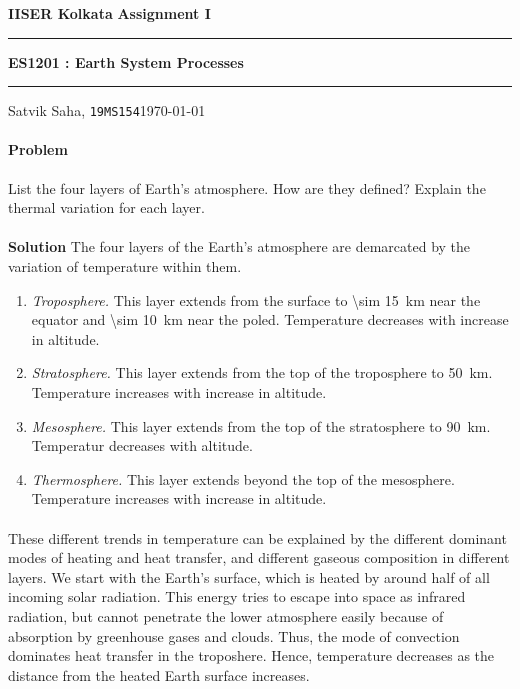 \documentclass[10pt]{article}
\newcounter{prob}
\def\problem{\stepcounter{prob}\paragraph{Problem \arabic{prob}}}
\def\solution{\\\\\textbf{Solution }}
\begin{document}
        \par\textbf{IISER Kolkata} \hfill \textbf{Assignment I}
        \vspace{3pt}
        \hrule
        \vspace{3pt}
        \begin{center}
                \LARGE{\textbf{ES1201 : Earth System Processes}}
        \end{center}
        \vspace{3pt}
        \hrule
        \vspace{3pt}
        Satvik Saha, \texttt{19MS154}\hfill\today
        \vspace{20pt}

        \problem List the four layers of Earth's atmosphere. How are they defined? Explain the thermal variation for each layer.
        \solution The four layers of the Earth's atmosphere are demarcated by the variation of temperature within them.
        \begin{enumerate}[label=(\roman*), itemsep=0pt, topsep=\parsep]
                \item \textit{Troposphere.} This layer extends from the surface to \SI{\sim 15}{\kilo\metre} near the equator and 
                \SI{\sim 10}{\kilo\metre} near the poled. Temperature decreases with increase in altitude.
                \item \textit{Stratosphere.} This layer extends from the top of the troposphere to \SI{50}{\kilo\metre}.
                Temperature increases with increase in altitude.
                \item \textit{Mesosphere.} This layer extends from the top of the stratosphere to \SI{90}{\kilo\metre}.
                Temperatur decreases with altitude.
                \item \textit{Thermosphere.} This layer extends beyond the top of the mesosphere.
                Temperature increases with increase in altitude.
        \end{enumerate}

        \paragraph{}
        These different trends in temperature can be explained by the different dominant modes of heating and heat transfer, and different gaseous
        composition in different layers. We start with the Earth's surface, which is heated by around half of all incoming solar radiation.
        This energy tries to escape into space as infrared radiation, but cannot penetrate the lower atmosphere easily because of absorption
        by greenhouse gases and clouds. Thus, the mode of convection dominates heat transfer in the troposhere.
        Hence, temperature decreases as the distance from the heated Earth surface increases.
\end{document}
